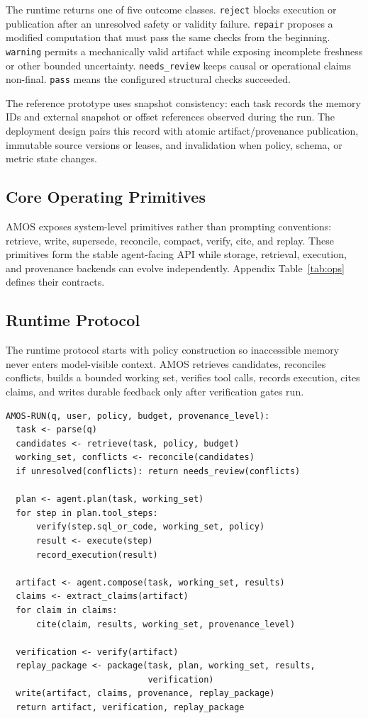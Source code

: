 \documentclass[10pt]{article}
\newcommand{\amos}{\textsc{AMOS}\xspace}
\newcommand{\code}[1]{\texttt{#1}}
\begin{document}
The runtime returns one of five outcome classes. \code{reject} blocks execution or publication after an unresolved safety or validity failure. \code{repair} proposes a modified computation that must pass the same checks from the beginning. \code{warning} permits a mechanically valid artifact while exposing incomplete freshness or other bounded uncertainty. \code{needs\_review} keeps causal or operational claims non-final. \code{pass} means the configured structural checks succeeded.

The reference prototype uses snapshot consistency: each task records the memory IDs and external snapshot or offset references observed during the run. The deployment design pairs this record with atomic artifact/provenance publication, immutable source versions or leases, and invalidation when policy, schema, or metric state changes.

\subsection{Core Operating Primitives}
\amos exposes system-level primitives rather than prompting conventions: retrieve, write, supersede, reconcile, compact, verify, cite, and replay. These primitives form the stable agent-facing API while storage, retrieval, execution, and provenance backends can evolve independently. Appendix Table~\ref{tab:ops} defines their contracts.

\subsection{Runtime Protocol}
The runtime protocol starts with policy construction so inaccessible memory never enters model-visible context. \amos retrieves candidates, reconciles conflicts, builds a bounded working set, verifies tool calls, records execution, cites claims, and writes durable feedback only after verification gates run.

\begin{verbatim}
AMOS-RUN(q, user, policy, budget, provenance_level):
  task <- parse(q)
  candidates <- retrieve(task, policy, budget)
  working_set, conflicts <- reconcile(candidates)
  if unresolved(conflicts): return needs_review(conflicts)

  plan <- agent.plan(task, working_set)
  for step in plan.tool_steps:
      verify(step.sql_or_code, working_set, policy)
      result <- execute(step)
      record_execution(result)

  artifact <- agent.compose(task, working_set, results)
  claims <- extract_claims(artifact)
  for claim in claims:
      cite(claim, results, working_set, provenance_level)

  verification <- verify(artifact)
  replay_package <- package(task, plan, working_set, results,
                            verification)
  write(artifact, claims, provenance, replay_package)
  return artifact, verification, replay_package
\end{verbatim}
\end{document}

